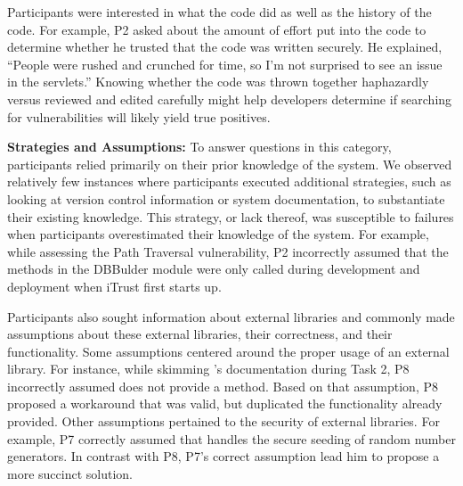 \documentclass[10pt,journal,compsoc]{IEEEtran}
\begin{document}
Participants were interested in what the code did as well as the history of the code.
For example, P2 asked about the amount of effort put into the code to determine whether he trusted that the code was written securely.
He explained, ``People were rushed and crunched for time, so I'm not surprised to see an issue in the servlets.'' 
Knowing whether the code was thrown together haphazardly versus reviewed and edited carefully might help developers determine if searching for vulnerabilities will likely yield true positives.


\textbf{Strategies and Assumptions:}
To answer questions in this category, participants relied primarily on their prior knowledge of the system.
We observed relatively few instances where participants executed additional strategies, such as looking at version control information or system documentation, to substantiate their existing knowledge. 
This strategy, or lack thereof, was susceptible to failures when participants overestimated their knowledge of the system.
For example, while assessing the Path Traversal vulnerability, P2 incorrectly assumed that the methods in the DBBulder module were only called during development and deployment when iTrust first starts up.

Participants also sought information about external libraries and commonly made assumptions about these external libraries, their correctness, and their functionality.
Some assumptions centered around the proper usage of an external library. 
For instance, while skimming 's documentation during Task 2, P8 incorrectly assumed  does not provide a  method.
Based on that assumption, P8 proposed a workaround that was valid, but duplicated the functionality  already provided.
Other assumptions pertained to the security of external libraries.
For example, P7 correctly assumed that  handles the secure seeding of random number generators.
In contrast with P8, P7's correct assumption lead him to propose a more succinct solution.




\end{document}
